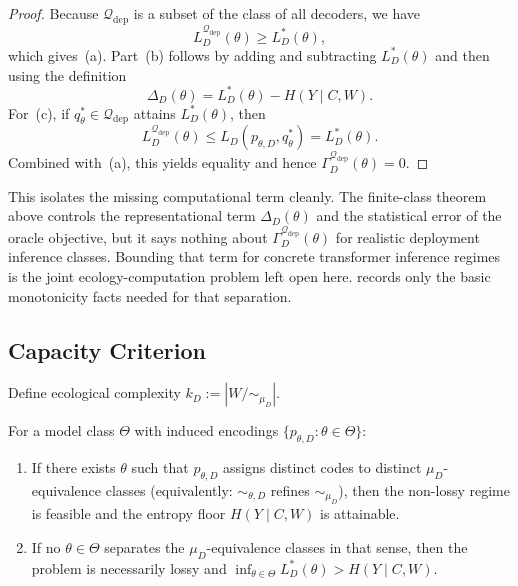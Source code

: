 \documentclass[twoside,11pt]{article}
\begin{document}
\begin{proof}
Because $\mathcal{Q}_{\mathrm{dep}}$ is a subset of the class of all decoders, we have
\[
L_D^{\mathcal{Q}_{\mathrm{dep}}}(\theta)
\ge L_D^*(\theta),
\]
which gives~(a). Part~(b) follows by adding and subtracting $L_D^*(\theta)$ and then using the definition
\[
\Delta_D(\theta)=L_D^*(\theta)-H(Y \mid C,W).
\]
For~(c), if $q_{\theta}^* \in \mathcal{Q}_{\mathrm{dep}}$ attains $L_D^*(\theta)$, then
\[
L_D^{\mathcal{Q}_{\mathrm{dep}}}(\theta)
\le L_D(p_{\theta,D},q_{\theta}^*)
= L_D^*(\theta).
\]
Combined with~(a), this yields equality and hence $\Gamma_D^{\mathcal{Q}_{\mathrm{dep}}}(\theta)=0$.
\end{proof}

This isolates the missing computational term cleanly. The finite-class theorem above controls the representational term $\Delta_D(\theta)$ and the statistical error of the oracle objective, but it says nothing about $\Gamma_D^{\mathcal{Q}_{\mathrm{dep}}}(\theta)$ for realistic deployment inference classes. Bounding that term for concrete transformer inference regimes is the joint ecology-computation problem left open here.  records only the basic monotonicity facts needed for that separation.

\subsection{Capacity Criterion}\label{sec:capacity}

Define ecological complexity $k_D := |W/{\sim_{\mu_D}}|$.

\begin{proposition}\label{prop:capacity-criterion}
For a model class $\Theta$ with induced encodings $\{p_{\theta,D} : \theta \in \Theta\}$:
\begin{enumerate}[label=(\alph*)]
\item If there exists $\theta$ such that $p_{\theta,D}$ assigns distinct codes to distinct $\mu_D$-equivalence classes (equivalently: ${\sim_{\theta,D}}$ refines ${\sim_{\mu_D}}$), then the non-lossy regime is feasible and the entropy floor $H(Y \mid C,W)$ is attainable.

\item If no $\theta \in \Theta$ separates the $\mu_D$-equivalence classes in that sense, then the problem is necessarily lossy and $\inf_{\theta \in \Theta} L_D^*(\theta) > H(Y \mid C,W)$.
\end{enumerate}
\end{proposition}
\end{document}
